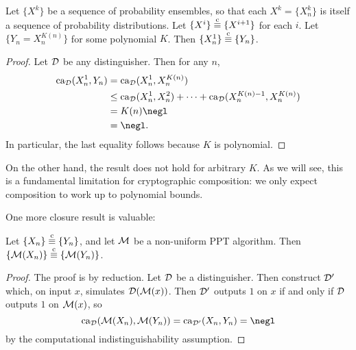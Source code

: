 \begin{prop}\label{thm:polynomial-indistinguishability}
  Let $\{X^k\}$ be a sequence of probability ensembles, so
  that each $X^k = \{X^k_n\}$ is itself a sequence of probability distributions.
  Let $\{X^i\}\overset{\text{c}}{\equiv}\{X^{i+1}\}$ for each $i$. Let $\{Y_n = X^{K(n)}_n\}$ for
  some polynomial $K$. Then $\{X^1_n\}\overset{\text{c}}{\equiv}\{Y_n\}$.
\end{prop}

\begin{proof}
  Let $\mathcal{D}$ be any distinguisher. Then for any $n$, \begin{align*}
    \ca_\cD(X^1_n, Y_n) &= \ca_\cD(X^1_n, X^{K(n)}_n) \\
                          &\leq \ca_\cD(X^1_n, X^2_n) + \cdots + \ca_\cD(X^{K(n) - 1}_n, X^{K(n)}_n) \\
                          &= K(n)\negl \\
                          &= \negl.
   \end{align*}
   In particular, the last equality follows because $K$ is polynomial.
\end{proof}

On the other hand, the result does not hold for arbitrary $K$. As we will see,
this is a fundamental limitation for cryptographic composition: we only expect
composition to work up to polynomial bounds.

One more closure result is valuable:

\begin{prop}\label{thm:ci-composition}
  Let $\{X_n\}\overset{\text{c}}{\equiv}\{Y_n\}$, and let $\mathcal{M}$ be a non-uniform PPT algorithm. Then
  $\{\mathcal{M}(X_n)\} \overset{\text{c}}{\equiv} \{\mathcal{M}(Y_n)\}$.
\end{prop}

\begin{proof}
  The proof is by reduction. Let $\mathcal{D}$ be a distinguisher. Then construct $\mathcal{D}'$
  which, on input $x$, simulates $\mathcal{D}(\mathcal{M}(x))$. Then $\mathcal{D}'$ outputs $1$ on $x$ if and
  only if $\mathcal{D}$ outputs $1$ on $\mathcal{M}(x)$, so \[
    \ca_\cD(\cM(X_n), \cM(Y_n)) = \ca_{\cD'}(X_n, Y_n) = \negl
  \] by the computational indistinguishability assumption.
\end{proof}

